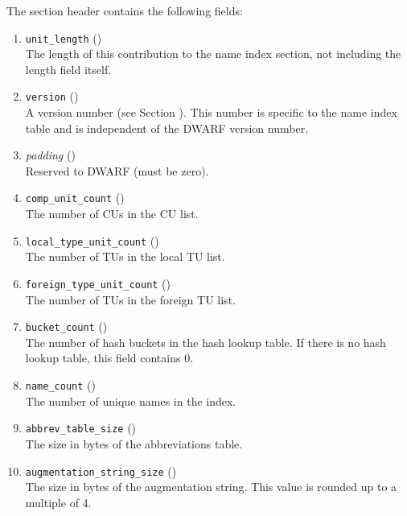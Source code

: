 \label{chap:sectionheader}
The section header contains the following fields:
\begin{enumerate}[1. ]
\item \texttt{unit\_length} () \\
The length of this contribution to the name index section,
not including the length field itself.

\item \texttt{version} (\HFTuhalf) \\
A version number 
(see Section ). 
This number is specific to the name index table and is
independent of the DWARF version number.

\item \textit{padding} (\HFTuhalf) \\
Reserved to DWARF (must be zero). 

\item \texttt{comp\_unit\_count} (\HFTuword) \\
The number of CUs in the CU list.

\item \texttt{local\_type\_unit\_count} (\HFTuword) \\
The number of TUs in the local TU list.

\item \texttt{foreign\_type\_unit\_count} (\HFTuword) \\
The number of TUs in the foreign TU list.

\item \texttt{bucket\_count} (\HFTuword) \\
The number of hash buckets in the hash lookup table. 
If there is no hash lookup table, this field contains 0.

\item \texttt{name\_count} (\HFTuword) \\
The number of unique names in the index.

\item \texttt{abbrev\_table\_size} (\HFTuword) \\
The size in bytes of the abbreviations table.

\item \texttt{augmentation\_string\_size} (\HFTuword) \\
The size in bytes of the augmentation string. This value is
rounded up to a multiple of 4.


\end{enumerate}
